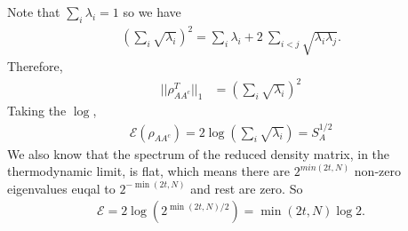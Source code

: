 Note that $\sum_i \lambda_i =1$ so we have
\begin{align}
    \left(\sum_i \sqrt{\lambda_i}\right)^2 = \sum_i \lambda_i + 2\ \sum_{i<j}\sqrt{\lambda_i \lambda_j}.
\end{align}
Therefore, 
\begin{align}
    ||\rho_{AA^c}^T||_1&= \left(\sum_i \sqrt{\lambda_i}\right)^2
\end{align}
Taking the $\log$, 
\begin{align}
    \mathcal{E}(\rho_{AA^c})=2 \log \left(\sum_i \sqrt{\lambda_i}\right)=S^{1/2}_A
\end{align}
We also know that the spectrum of the reduced density matrix, in the thermodynamic limit, is flat, which means there are $2^{min(2t,N)}$ non-zero eigenvalues euqal to $2^{-\min(2t,N)}$ and rest are zero. So
\begin{align}
    \mathcal{E}=2\log\left(2^{\min(2t,N)/2}\right)=\min(2t,N)\log2.
\end{align}
